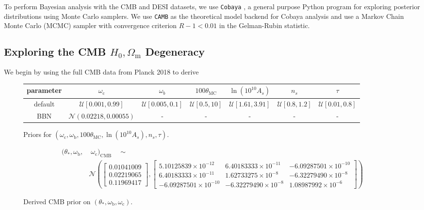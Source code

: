\documentclass{lkx_paper}
\renewcommand{\b}{{\mathrm{b}}}
\renewcommand{\c}{{\mathrm{c}}}
\newcommand{\m}{{\mathrm{m}}}
\newcommand{\MC}{{\mathrm{MC}}}
\newcommand{\CMB}{\mathrm{CMB}}
\newcommand{\UU}{{\mathcal{U}}}
\newcommand{\NN}{{\mathcal{N}}}
\begin{document}
To perform Bayesian analysis with the CMB and DESI datasets, we use \texttt{Cobaya} \cite{Torrado_2021}, a general purpose Python program for exploring posterior distributions using Monte Carlo samplers. We use \texttt{CAMB} as the theoretical model backend for Cobaya analysis and use a Markov Chain Monte Carlo (MCMC) sampler with convergence criterion $R-1<0.01$ in the Gelman-Rubin statistic.

\subsection*{Exploring the CMB $H_0,\Omega_\m$ Degeneracy}

We begin by using the full CMB data from Planck 2018 to derive  

\begin{figure}[ht]
  \renewcommand{\arraystretch}{1.2}
  \centering
  \begin{tabular}{|c|c|c|c|c|c|c|}
    \hline
    parameter & $\omega_\c$ & $\omega_b$ & $100\theta_\MC$ & $\ln(10^{10} A_s)$ & $n_s$ & $\tau$\\
    \hline
    default & $\UU[0.001, 0.99]$ & $\UU[0.005, 0.1]$ &$\UU[0.5,10]$ &$\UU[1.61,3.91]$ &$\UU[0.8,1.2]$ & $\UU[0.01, 0.8]$  \\
    \hline
    BBN & $\NN(0.02218, 0.00055)$  &-&-&-&-&- \\
    \hline
  \end{tabular}
  \medskip
  \caption{Priors for $(\omega_\mathrm{c}, \omega_\mathrm{b}, 100\theta_{\mathrm{MC}}, \ln(10^{10}A_s), n_s, \tau)$.}
\end{figure}


\begin{figure}[ht]
  \centering
  \[
    \begin{aligned}
      (\theta_*, \omega_\b,&\; \omega_\c)_{\CMB} \quad\sim\quad\\ 
                                              &\NN\left(
\begin{bmatrix}
0.01041009 \\
0.02219065 \\
0.11969417
\end{bmatrix},
\begin{bmatrix}
5.10125839\times10^{-12} & 6.40183333\times10^{-11} & -6.09287501\times10^{-10} \\
6.40183333\times10^{-11} & 1.62733275\times10^{-8}  & -6.32279490\times10^{-8}  \\
-6.09287501\times10^{-10} & -6.32279490\times10^{-8} & 1.08987992\times10^{-6}
\end{bmatrix}\right)
    \end{aligned}
\]
  \caption{Derived CMB prior on $(\theta_*, \omega_\b, \omega_\c)$.}
\end{figure}
\end{document}
